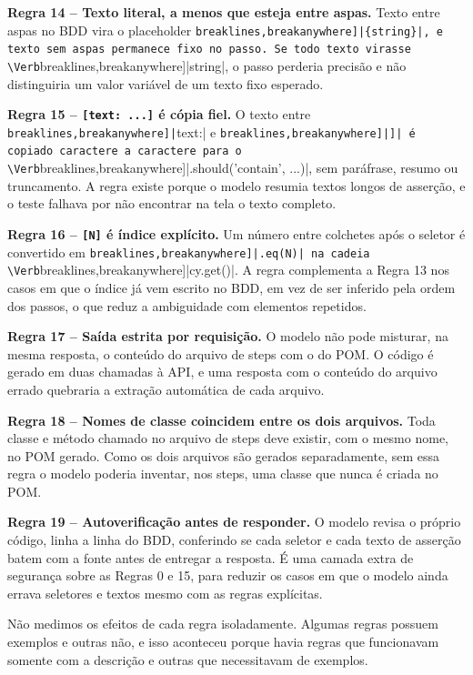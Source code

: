 \textbf{Regra 14 -- Texto literal, a menos que esteja entre aspas.} Texto entre aspas no BDD vira o placeholder \Verb[breaklines,breakanywhere]|{string}|, e texto sem aspas permanece fixo no passo. Se todo texto virasse \Verb[breaklines,breakanywhere]|{string}|, o passo perderia precisão e não distinguiria um valor variável de um texto fixo esperado.

\textbf{Regra 15 -- \texttt{[text: ...]} é cópia fiel.} O texto entre \Verb[breaklines,breakanywhere]|[text:| e \Verb[breaklines,breakanywhere]|]| é copiado caractere a caractere para o \Verb[breaklines,breakanywhere]|.should('contain', ...)|, sem paráfrase, resumo ou truncamento. A regra existe porque o modelo resumia textos longos de asserção, e o teste falhava por não encontrar na tela o texto completo.

\textbf{Regra 16 -- \texttt{[N]} é índice explícito.} Um número entre colchetes após o seletor é convertido em \Verb[breaklines,breakanywhere]|.eq(N)| na cadeia \Verb[breaklines,breakanywhere]|cy.get()|. A regra complementa a Regra 13 nos casos em que o índice já vem escrito no BDD, em vez de ser inferido pela ordem dos passos, o que reduz a ambiguidade com elementos repetidos.

\textbf{Regra 17 -- Saída estrita por requisição.} O modelo não pode misturar, na mesma resposta, o conteúdo do arquivo de steps com o do POM. O código é gerado em duas chamadas à API, e uma resposta com o conteúdo do arquivo errado quebraria a extração automática de cada arquivo.

\textbf{Regra 18 -- Nomes de classe coincidem entre os dois arquivos.} Toda classe e método chamado no arquivo de steps deve existir, com o mesmo nome, no POM gerado. Como os dois arquivos são gerados separadamente, sem essa regra o modelo poderia inventar, nos steps, uma classe que nunca é criada no POM.

\textbf{Regra 19 -- Autoverificação antes de responder.} O modelo revisa o próprio código, linha a linha do BDD, conferindo se cada seletor e cada texto de asserção batem com a fonte antes de entregar a resposta. É uma camada extra de segurança sobre as Regras 0 e 15, para reduzir os casos em que o modelo ainda errava seletores e textos mesmo com as regras explícitas.

Não medimos os efeitos de cada regra isoladamente. Algumas regras possuem exemplos e outras não, e isso aconteceu porque havia regras que funcionavam somente com a descrição e outras que necessitavam de exemplos.


